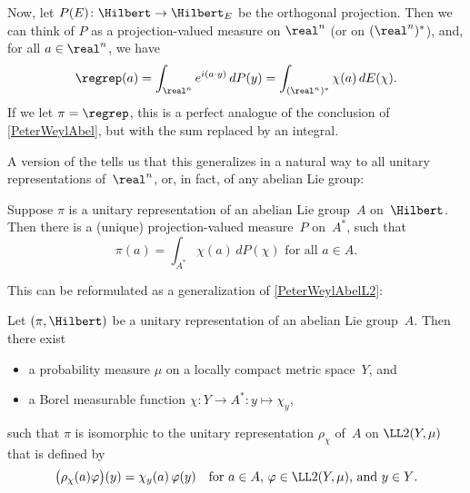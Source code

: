 Now, let $P(E)\colon \Hilbert \to \Hilbert_E$ be the orthogonal projection. Then we can think of $P$ as a projection-valued measure on $\real^n$ (or on $(\real^n)^*$), and, for all $a \in \real^n$,  we have
	$$\regrep(a) = \int_{\real^n} e^{i (a \cdot y)} \, dP(y)
		= \int_{(\real^n)^*} \chi(a) \, dE(\chi) .$$
If we let $\pi = \regrep$, this is a perfect analogue of the conclusion of \cref{PeterWeylAbel}, but with the sum replaced by an integral.

A version of the  tells us that this generalizes in a natural way to all unitary representations of~$\real^n$, or, in fact, of any abelian Lie group:

\begin{prop} \label{ProjValMeas}
Suppose $\pi$ is a unitary representation of an abelian Lie group~$A$ on~$\Hilbert$. Then there is a \textup(unique\/\textup) projection-valued measure~$P$ on\/~$A^*$, such that
	$$ \text{$\pi(a) = \int_{A^*} \chi(a) \, dP(\chi)$ \ for all $a \in A$} . $$
\end{prop}

This can be reformulated as a generalization of \cref{PeterWeylAbelL2}:

\begin{cor} \label{IntIrredAbel}
Let $(\pi,\Hilbert)$ be a unitary representation of an abelian Lie group~$A$.  Then there exist
	\begin{itemize}
	\item a probability measure $\mu$ on a locally compact metric space~$Y$,
	and
	\item a Borel measurable function $\chi \colon Y \to A^* \colon y \mapsto \chi_y$,
	\end{itemize}
such that $\pi$ is isomorphic to the unitary representation $\rho_\chi$ of~$A$ on $\LL2(Y, \mu)$ that is defined by
	$$ \bigl( \rho_\chi(a) \varphi  \bigr)(y) = \chi_y(a) \, \varphi(y)
	 \quad \text{for $a \in A$, $\varphi \in \LL2(Y, \mu )$, and $y \in Y$} .$$
\end{cor}

